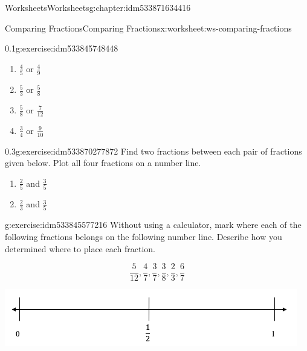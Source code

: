 \documentclass[twoside,11pt,]{book}
\begin{document}
\begin{chapterptx}{Worksheets}{}{Worksheets}{}{}{g:chapter:idm533871634416}
\begin{worksheet-section-numberless}{Comparing Fractions}{}{Comparing Fractions}{}{}{x:worksheet:ws-comparing-fractions}
\begin{divisionexercise}{3}{}{0.1}{g:exercise:idm533845748448}
%
\begin{enumerate}[label=(\alph*)]
\item{}\(\frac{4}{5} \) or \(\frac{4}{9} \)%
\item{}\(\frac{5}{3} \) or \(\frac{5}{8} \)%
\item{}\(\frac{5}{8} \) or \(\frac{7}{12} \)%
\item{}\(\frac{3}{4} \) or \(\frac{9}{10} \)%
\end{enumerate}
\end{divisionexercise}%
\clearpage
\begin{divisionexercise}{4}{}{0.3}{g:exercise:idm533870277872}%
Find two fractions between each pair of fractions given below. Plot all four fractions on a number line.%
%
\begin{enumerate}[label=(\alph*)]
\item{}\(\frac{2}{5} \) and \(\frac{3}{5} \)%
\item{}\(\frac{2}{3} \) and \(\frac{3}{5} \)%
\end{enumerate}
\end{divisionexercise}%
\begin{divisionexercise}{5}{}{}{g:exercise:idm533845577216}%
Without using a calculator, mark where each of the following fractions belongs on the following number line. Describe how you determined where to place each fraction.%
\par
%
\begin{equation*}
\frac{5}{12} , \frac{4}{7} , \frac{3}{7} , \frac{3}{8} , \frac{2}{3} , \frac{6}{7} 
\end{equation*}
%
\begin{sidebyside}{1}{0.05}{0.05}{0}%
\begin{sbspanel}{0.9}%
\includegraphics[width=1\linewidth]{images/number-line-half-one.png}
\end{sbspanel}%
\end{sidebyside}%
\end{divisionexercise}%
\end{worksheet-section-numberless}
\restoregeometry
%
%
\typeout{************************************************}
\typeout{************************************************}
%

\end{chapterptx}
\end{document}

